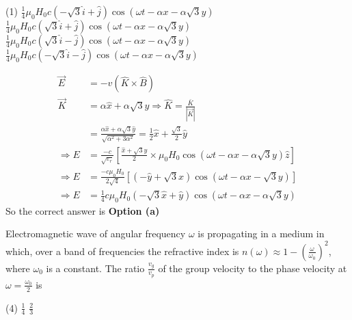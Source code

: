 \begin{enumerate}
\begin{minipage}{\textwidth}
	\end{minipage}
	\begin{tasks}(1)
		\task[\textbf{a.}] $\frac{1}{4} \mu_{0} H_{0} c(-\sqrt{3} \hat{i}+\hat{j}) \cos (\omega t-\alpha x-\alpha \sqrt{3} y)$ 
		\task[\textbf{b.}] $\frac{1}{4} \mu_{0} H_{0} c(\sqrt{3} \hat{i}+\hat{j}) \cos (\omega t-\alpha x-\alpha \sqrt{3} y)$
		\task[\textbf{c.}]$\frac{1}{4} \mu_{0} H_{0} c(\sqrt{3} \hat{i}-\hat{j}) \cos (\omega t-\alpha x-\alpha \sqrt{3} y)$
		\task[\textbf{d.}]$\frac{1}{4} \mu_{0} H_{0} c(-\sqrt{3} \hat{i}-\hat{j}) \cos (\omega t-\alpha x-\alpha \sqrt{3} y)$
	\end{tasks}
\begin{answer}
	\begin{align*}
	\vec{E}&=-v(\hat{K} \times \hat{B})\\
	\vec{K}&=\alpha \hat{x}+\alpha \sqrt{3} \hat{y} \Rightarrow \hat{K}=\frac{\bar{K}}{|\vec{K}|}\\&=\frac{\alpha \hat{x}+\alpha \sqrt{3} \hat{y}}{\sqrt{\alpha^{2}+3 \alpha^{2}}}=\frac{1}{2} \hat{x}+\frac{\sqrt{3}}{2} \hat{y}\\
	\Rightarrow E&=\frac{-c}{\sqrt{\varepsilon_{r}}}\left[\frac{\hat{x}+\sqrt{3} \hat{y}}{2} \times \mu_{0} H_{0} \cos (\omega t-\alpha x-\alpha \sqrt{3} y) \hat{z}\right]\\
	\Rightarrow E&=\frac{-c \mu_{0} H_{0}}{2 \sqrt{4}}[(-\hat{y}+\sqrt{3} \hat{x}) \cos (\omega t-\alpha x-\sqrt{3} y)]\\
	\Rightarrow E&=\frac{1}{4} c \mu_{0} H_{0}(-\sqrt{3} \hat{x}+\hat{y}) \cos (\omega t-\alpha x-\alpha \sqrt{3} y)
	\end{align*}
	So the correct answer is \textbf{Option (a)}
\end{answer}
	\begin{minipage}{\textwidth}
		\item Electromagnetic wave of angular frequency $\omega$ is propagating in a medium in which, over a band of frequencies the refractive index is $n(\omega) \approx 1-\left(\frac{\omega}{\omega_{0}}\right)^{2}$, where $\omega_{0}$ is a constant. The ratio $\frac{v_{g}}{v_{p}}$ of the group velocity to the phase velocity at $\omega=\frac{\omega_{0}}{2}$ is
	\end{minipage}
	\begin{tasks}(4)
		\task[\textbf{b.}]$\frac{1}{4}$
		\task[\textbf{c.}]$\frac{2}{3}$
	\end{tasks}
	\begin{answer}

\end{answer}
\end{enumerate}
